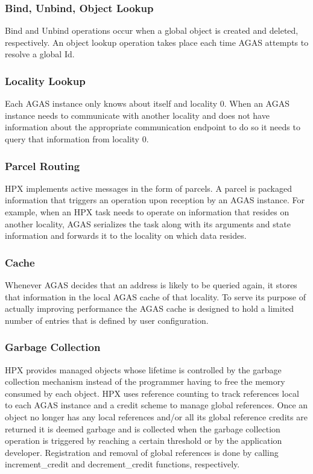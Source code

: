 \subsubsection{Bind, Unbind, Object Lookup}
Bind and Unbind operations occur when a global object is created and deleted, 
respectively. An object lookup operation takes place each time AGAS attempts 
to resolve a global Id.

\subsubsection{Locality Lookup}
Each AGAS instance only knows about itself and locality 0. When an AGAS
instance needs to communicate with another locality and does not have
information about the appropriate communication endpoint to do so it needs to
query that information from locality 0.

\subsubsection{Parcel Routing}
HPX implements active messages in the form of parcels. A parcel is packaged
information that triggers an operation upon reception by an AGAS instance. For
example, when an HPX task needs to operate on information that resides on
another locality, AGAS serializes the task along with its arguments and state
information and forwards it to the locality on which data resides.

\subsubsection{Cache}
Whenever AGAS decides that an address is likely to be queried again, it stores
that information in the local AGAS cache of that locality. To serve its purpose of actually improving
performance the AGAS cache is designed to hold a limited number of entries that is
defined by user configuration.

\subsubsection{Garbage Collection}
\label{sec:garbage_collection}
HPX provides managed objects whose lifetime is controlled by the garbage
collection mechanism instead of the programmer having to free the memory
consumed by each object. HPX uses reference counting to track references local
to each AGAS instance and a credit scheme to manage global references. Once an
object no longer has any local references and/or all its global reference
credits are returned it is deemed garbage and is collected when the garbage
collection operation is triggered by reaching a certain threshold or by the
application developer. Registration and removal of global references is done by
calling increment\_credit and decrement\_credit functions, respectively.
